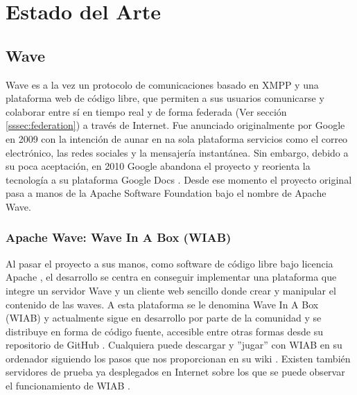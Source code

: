 \newpage
\thispagestyle{sectioned}
\chapter{Estado del Arte}

\section{Wave}

	Wave es a la vez un protocolo de comunicaciones basado en XMPP\cite{ref:wave_over_xmpp} y una plataforma web de código libre, que permiten a sus usuarios comunicarse y colaborar entre sí en tiempo real y de forma federada (Ver sección \ref{sssec:federation}) a través de Internet. Fue anunciado originalmente por Google en 2009 \cite{ref:wave_announcement} con la intención de aunar en na sola plataforma servicios como el correo electrónico, las redes sociales y la mensajería instantánea. Sin embargo, debido a su poca aceptación, en 2010 Google abandona el proyecto \cite{ref:google_wave_end} y reorienta la tecnología a su plataforma Google Docs \cite{ref:google_docs}. Desde ese momento el proyecto original pasa a manos de la Apache Software Foundation bajo el nombre de Apache Wave.

	\subsection{Apache Wave: Wave In A Box (WIAB)}
	
	Al pasar el proyecto a sus manos, como software de código libre bajo licencia Apache \cite{ref:apache_license}, el desarrollo se centra en conseguir implementar una plataforma que integre un servidor Wave y un cliente web sencillo donde crear y manipular el contenido de las waves. A esta plataforma se le denomina Wave In A Box (WIAB) y actualmente sigue en desarrollo por parte de la comunidad y se distribuye en forma de código fuente, accesible entre otras formas desde su repositorio de GitHub \cite{ref:wave_in_a_box_github}. Cualquiera puede descargar y ''jugar'' con WIAB en su ordenador siguiendo los pasos que nos proporcionan en su wiki \cite{ref:wave_in_a_box_wiki}. Existen también servidores de prueba ya desplegados en Internet sobre los que se puede observar el funcionamiento de WIAB \cite {ref:wave_in_a_box_server}.
	
